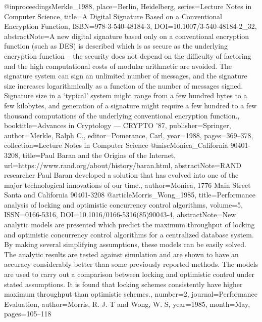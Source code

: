 {{ @inproceedings{Merkle_1988, place={Berlin, Heidelberg}, series={Lecture Notes in Computer Science}, title={A Digital Signature Based on a Conventional Encryption Function}, ISBN={978-3-540-48184-3}, DOI={10.1007/3-540-48184-2_32}, abstractNote={A new digital signature based only on a conventional encryption function (such as DES) is described which is as secure as the underlying encryption function -- the security does not depend on the difficulty of factoring and the high computational costs of modular arithmetic are avoided. The signature system can sign an unlimited number of messages, and the signature size increases logarithmically as a function of the number of messages signed. Signature size in a ‘typical’ system might range from a few hundred bytes to a few kilobytes, and generation of a signature might require a few hundred to a few thousand computations of the underlying conventional encryption function.}, booktitle={Advances in Cryptology — CRYPTO ’87}, publisher={Springer}, author={Merkle, Ralph C.}, editor={Pomerance, Carl}, year={1988}, pages={369–378}, collection={Lecture Notes in Computer Science} }
 @misc{Monica_California 90401-3208, title={Paul Baran and the Origins of the Internet}, url={https://www.rand.org/about/history/baran.html}, abstractNote={RAND researcher Paul Baran developed a solution that has evolved into one of the major technological innovations of our time.}, author={Monica, 1776 Main Street Santa and California 90401-3208} }
 @article{Morris_Wong_1985, title={Performance analysis of locking and optimistic concurrency control algorithms}, volume={5}, ISSN={0166-5316}, DOI={10.1016/0166-5316(85)90043-4}, abstractNote={New analytic models are presented which predict the maximum throughput of locking and optimistic concurrency control algorithms for a centralized database system. By making several simplifying assumptions, these models can be easily solved. The analytic results are tested against simulation and are shown to have an accuracy considerably better than some previously reported methods. The models are used to carry out a comparison between locking and optimistic control under stated assumptions. It is found that locking schemes consistently have higher maximum throughput than optimistic schemes.}, number={2}, journal={Performance Evaluation}, author={Morris, R. J. T and Wong, W. S}, year={1985}, month={May}, pages={105–118} }
}}
